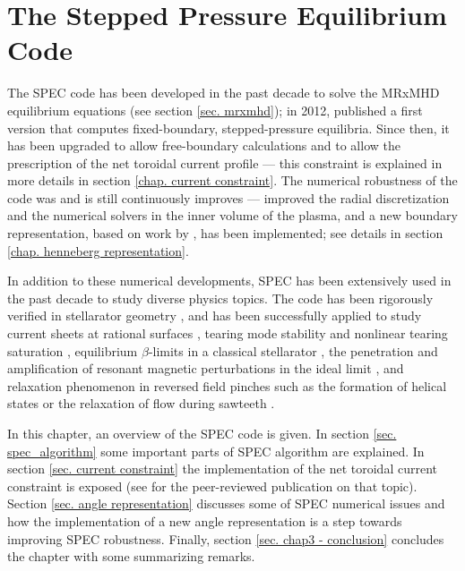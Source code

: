 \documentclass[my_thesis.tex]{subfiles}
\begin{document}
\chapter{The Stepped Pressure Equilibrium Code}

The SPEC code has been developed in the past decade to solve the MRxMHD equilibrium equations (see section \ref{sec. mrxmhd}); in 2012, \citep{Hudson2012} published a first version that computes fixed-boundary, stepped-pressure equilibria. Since then, it has been upgraded to allow free-boundary calculations \citep{Hudson2020c} and to allow the prescription of the net toroidal current profile \citep{Baillod2021} --- this constraint is explained in more details in section \ref{chap. current constraint}. The numerical robustness of the code was and is still continuously improves --- \citep{Qu2020} improved the radial discretization and the numerical solvers in the inner volume of the plasma, and a new boundary representation, based on work by \citet{Henneberg2021}, has been implemented; see details in section \ref{chap. henneberg representation}.

In addition to these numerical developments, SPEC has been extensively used in the past decade to study diverse physics topics. The code has been rigorously verified in stellarator geometry \citep{Loizu2016}, and has been successfully applied to study current sheets at rational surfaces \citep{Loizu2015,Loizu2015a,huang_numerical_2022}, tearing mode stability \citep{Loizu2019} and nonlinear tearing saturation \citep{Loizu2020}, equilibrium $\beta$-limits in a classical stellarator \citep{Loizu2017}, the penetration and amplification of resonant magnetic perturbations in the ideal limit \citep{Loizu2016}, and relaxation phenomenon in reversed field pinches such as the formation of helical states \citep{Dennis2013a} or the relaxation of flow during sawteeth \citep{Dennis2014,Qu2020}. 


In this chapter, an overview of the SPEC code is given. In section \ref{sec. spec_algorithm} some important parts of SPEC algorithm are explained. In section \ref{sec. current constraint} the implementation of the net toroidal current constraint is exposed (see \citep{Baillod2021} for the peer-reviewed publication on that topic). Section \ref{sec. angle representation} discusses some of SPEC numerical issues and how the implementation of a new angle representation is a step towards improving SPEC robustness. Finally, section \ref{sec. chap3 - conclusion} concludes the chapter with some summarizing remarks.
\end{document}
